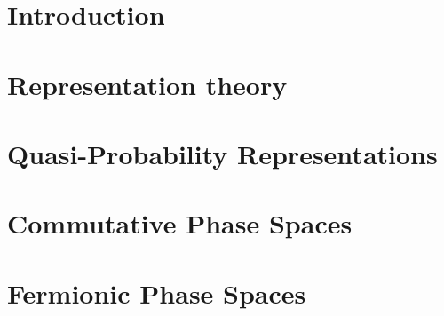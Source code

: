 \documentclass{unmeethesis}
\begin{document}





\tableofcontents

\listoffigures

\mainmatter

%

\chapter{Introduction}\label{ch:intro}


%

\chapter{Representation theory}\label{ch:rep}


\chapter{Quasi-Probability Representations}\label{ch:quasi-rep}


\chapter{Commutative Phase Spaces}\label{ch:commutative-phase-space}


\chapter{Fermionic Phase Spaces}\label{ch:matchgate}


%
\end{document}
